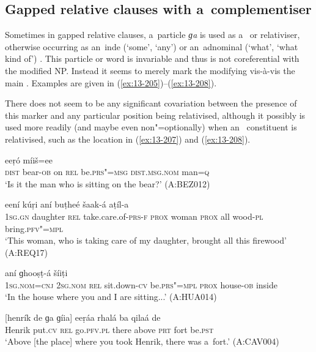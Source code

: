 \subsection{Gapped relative clauses with a~complementiser}
\label{subsec:13-6-4}


Sometimes in gapped relative clauses, a~particle \textit{ɡa} is used as a~ or relativiser, otherwise occurring as an~inde (`some', `any') or an~adnominal  (`what', `what kind of') . This particle or word is invariable and thus is not coreferential with the modified NP. Instead it seems to merely mark the modifying  vis-à-vis the main . Examples are given in (\ref{ex:13-205})--(\ref{ex:13-208}).


There does not seem to be any significant covariation between the presence of this marker and any particular position being relativised, although it possibly is used more readily (and maybe even non"=optionally) when an~ constituent is relativised, such as the location in (\ref{ex:13-207}) and (\ref{ex:13-208}). 

\begin{exe}
\ex
\label{ex:13-205}
 eeṛó  míiš=ee \\
\textsc{dist} bear-\textsc{ob} on \textsc{rel} be.\textsc{prs"=msg} \textsc{dist.msg.nom}   man=\textsc{q} \\
\glt `Is it the man who is sitting on the bear?' (A:BEZ012)

\ex
\label{ex:13-206}
 eení kúṛi  aní buṭheé šaak-á aṭíl-a \\
\textsc{1sg.gn} daughter \textsc{rel} take.care.of-\textsc{prs-f} \textsc{prox} woman \textsc{prox} all wood-\textsc{pl} bring.\textsc{pfv"=mpl} \\
\glt `This woman, who is taking care of my daughter, brought all this firewood' (A:REQ17)

\ex
\label{ex:13-207}
\gll [máa=ee tu ɡa bheš-í hín-a]  aní ɡhooṣṭ-á šíiṭi \\
\textsc{1sg.nom=cnj} \textsc{2sg.nom} \textsc{rel} sit.down-\textsc{cv} be.\textsc{prs"=mpl} \textsc{prox} house-\textsc{ob} inside  \\
\glt `In the house where you and I are sitting...' (A:HUA014)

\ex
\label{ex:13-208}
\gll \label{bkm:Ref190845659}[henrík de ɡa ɡíia] eeṛáa rhalá ba  qilaá de \\
Henrik put.\textsc{cv} \textsc{rel} go.\textsc{pfv.pl}  there above \textsc{prt} fort be.\textsc{pst } \\
\glt `Above [the place] where you took Henrik, there was a~fort.' (A:CAV004) 
\end{exe}

